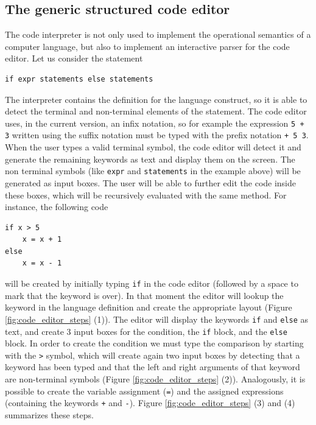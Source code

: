 \subsection{The generic structured code editor}
The code interpreter is not only used to implement the operational semantics of a computer language, but also to implement an interactive parser for the code editor. Let us consider the statement

\begin{lstlisting}
if expr statements else statements
\end{lstlisting}

The interpreter contains the definition for the language construct, so it is able to detect the terminal and non-terminal elements of the statement. The code editor uses, in the current version, an infix notation, so for example the expression \texttt{5 + 3} written using the suffix notation must be typed with the prefix notation \texttt{+ 5 3}. When the user types a valid terminal symbol, the code editor will detect it and generate the remaining keywords as text and display them on the screen. The non terminal symbols (like \texttt{expr} and \texttt{statements} in the example above) will be generated as input boxes. The user will be able to further edit the code inside these boxes, which will be recursively evaluated with the same method. For instance, the following code

\begin{lstlisting}
if x > 5
	x = x + 1
else
	x = x - 1
\end{lstlisting}

\noindent
will be created by initially typing \texttt{if} in the code editor (followed by a space to mark that the keyword is over). In that moment the editor will lookup the keyword in the language definition and create the appropriate layout (Figure \ref{fig:code_editor_steps} (1)). The editor will display the keywords \texttt{if} and \texttt{else} as text, and create 3 input boxes for the condition, the \texttt{if} block, and the \texttt{else} block. In order to create the condition we must type the comparison by starting with the \texttt{>} symbol, which will create again two input boxes by detecting that a keyword has been typed and that the left and right arguments of that keyword are non-terminal symbols (Figure \ref{fig:code_editor_steps} (2)). Analogously, it is possible to create the variable assignment (\texttt{=}) and the assigned expressions (containing the keywords \texttt{+} and \texttt{-}). Figure \ref{fig:code_editor_steps} (3) and (4) summarizes these steps.

